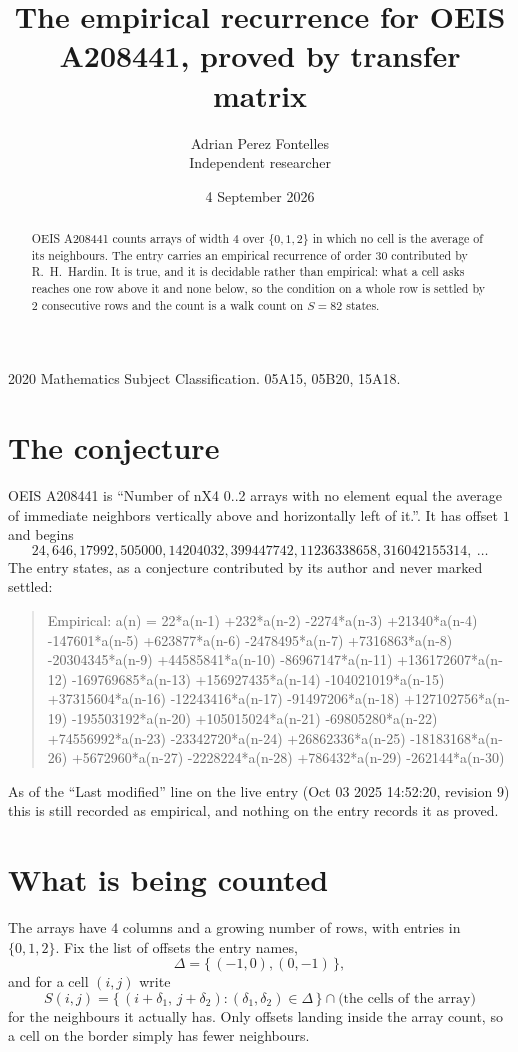 \documentclass[11pt,a4paper]{article}
\title{The empirical recurrence for OEIS A208441, proved by transfer matrix}
\author{Adrian Perez Fontelles\\ \small Independent researcher}
\date{4 September 2026}
\theoremstyle{plain}
\theoremstyle{definition}
\begin{document}
\maketitle

\begin{abstract}
OEIS A208441 counts arrays of width $4$ over $\{0,1,2\}$ in which no cell is the average of its neighbours. The entry carries an
empirical recurrence of order $30$ contributed by R.~H.~Hardin. It is true, and it is
decidable rather than empirical: what a cell asks reaches one row above
it and none below, so the condition on a whole row is settled by
$2$ consecutive rows and the count is a walk count on $S=82$ states.
\end{abstract}

\noindent\small 2020 Mathematics Subject Classification. 05A15, 05B20, 15A18.\normalsize

\section{The conjecture}

OEIS A208441 is ``Number of nX4 0..2 arrays with no element equal the average of immediate neighbors vertically above and horizontally left of it.''. It has offset $1$ and begins
\[
24, 646, 17992, 505000, 14204032, 399447742, 11236338658, 316042155314,\ \dots
\]
The entry states, as a conjecture contributed by its author and never marked settled:
\begin{quote}
Empirical: a(n) = 22*a(n-1) +232*a(n-2) -2274*a(n-3) +21340*a(n-4) -147601*a(n-5) +623877*a(n-6) -2478495*a(n-7) +7316863*a(n-8) -20304345*a(n-9) +44585841*a(n-10) -86967147*a(n-11) +136172607*a(n-12) -169769685*a(n-13) +156927435*a(n-14) -104021019*a(n-15) +37315604*a(n-16) -12243416*a(n-17) -91497206*a(n-18) +127102756*a(n-19) -195503192*a(n-20) +105015024*a(n-21) -69805280*a(n-22) +74556992*a(n-23) -23342720*a(n-24) +26862336*a(n-25) -18183168*a(n-26) +5672960*a(n-27) -2228224*a(n-28) +786432*a(n-29) -262144*a(n-30)
\end{quote}
As of the ``Last modified'' line on the live entry (Oct 03 2025 14:52:20, revision 9) this is still
recorded as empirical, and nothing on the entry records it as proved.

\section{What is being counted}

The arrays have $4$ columns and a growing number of rows, with entries in $\{0,1,2\}$. Fix the
list of offsets the entry names,
\[
\Delta=\{\,(-1,0), (0,-1)\,\},
\]
and for a cell $(i,j)$ write
\[
S(i,j)=\{\,(i+\delta_1,\,j+\delta_2) : (\delta_1,\delta_2)\in\Delta\,\}\cap
\text{(the cells of the array)}
\]
for the neighbours it actually has. Only offsets landing inside the array count, so a cell on
the border simply has fewer neighbours.
\end{document}
